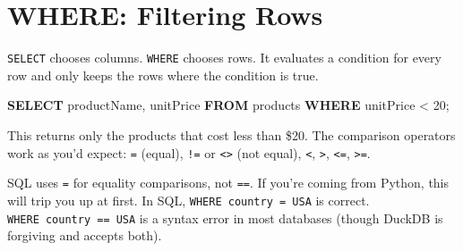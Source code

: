 \documentclass[
  letterpaper,
  DIV=11,
  numbers=noendperiod]{scrreprt}
\newenvironment{Shaded}{\begin{snugshade}}{\end{snugshade}}
\newcommand{\DecValTok}[1]{\textcolor[rgb]{0.68,0.00,0.00}{#1}}
\newcommand{\KeywordTok}[1]{\textcolor[rgb]{0.00,0.23,0.31}{\textbf{#1}}}
\newcommand{\NormalTok}[1]{\textcolor[rgb]{0.00,0.23,0.31}{#1}}
\newcommand{\OperatorTok}[1]{\textcolor[rgb]{0.37,0.37,0.37}{#1}}
\begin{document}
\section{WHERE: Filtering Rows}\label{where-filtering-rows}

\texttt{SELECT} chooses columns. \texttt{WHERE} chooses rows. It
evaluates a condition for every row and only keeps the rows where the
condition is true.

\begin{codelisting}

\caption{\texttt{duckdb}}

\begin{Shaded}
\begin{Highlighting}[]
\KeywordTok{SELECT}
\NormalTok{    productName,}
\NormalTok{    unitPrice}
\KeywordTok{FROM}\NormalTok{ products}
\KeywordTok{WHERE}\NormalTok{ unitPrice }\OperatorTok{\textless{}} \DecValTok{20}\NormalTok{;}
\end{Highlighting}
\end{Shaded}

\end{codelisting}

This returns only the products that cost less than \$20. The comparison
operators work as you'd expect: \texttt{=} (equal), \texttt{!=} or
\texttt{\textless{}\textgreater{}} (not equal), \texttt{\textless{}},
\texttt{\textgreater{}}, \texttt{\textless{}=},
\texttt{\textgreater{}=}.

\begin{tcolorbox}[enhanced jigsaw, opacitybacktitle=0.6, arc=.35mm, colback=white, bottomtitle=1mm, opacityback=0, toprule=.15mm, left=2mm, colbacktitle=quarto-callout-warning-color!10!white, breakable, coltitle=black, toptitle=1mm, colframe=quarto-callout-warning-color-frame, bottomrule=.15mm, titlerule=0mm, title=\textcolor{quarto-callout-warning-color}{\faExclamationTriangle}\hspace{0.5em}{Equality Uses Single Equals}, rightrule=.15mm, leftrule=.75mm]

SQL uses \texttt{=} for equality comparisons, not \texttt{==}. If you're
coming from Python, this will trip you up at first. In SQL,
\texttt{WHERE\ country\ =\ \textquotesingle{}USA\textquotesingle{}} is
correct.
\texttt{WHERE\ country\ ==\ \textquotesingle{}USA\textquotesingle{}} is
a syntax error in most databases (though DuckDB is forgiving and accepts
both).

\end{tcolorbox}
\end{document}

